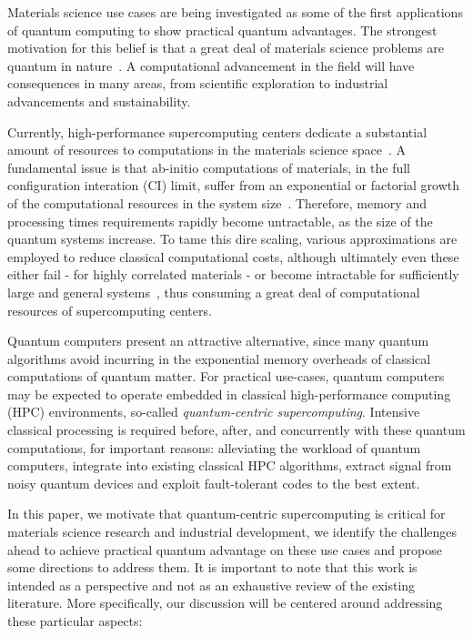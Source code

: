\newcommand{\cmt}[1]{\textcolor{red}{#1}}

\newpage

Materials science use cases are being investigated as some of the first applications of quantum computing to show practical quantum advantages. The strongest motivation for this belief is that a great deal of materials science problems are quantum in nature~\cite{feynman1982simulating}. 
A computational advancement in the field will have consequences in many areas, from scientific exploration to industrial advancements and sustainability.

Currently, high-performance supercomputing centers dedicate a substantial amount of resources to computations in the materials science space~\cite{ALCF_MaterialsScience,austin2020nersc,Connor2023instcomp,DIPC_HPC}. A fundamental issue is that ab-initio computations of materials, in the full configuration interation (CI) limit, suffer from an exponential or factorial growth of the computational resources in the system size~\cite{ciapprox-book,ciapprox-1,doi:10.1021/acs.jctc.7b00725,ciapprox-2,ciapprox-3,ciapprox-4}. Therefore, memory and processing times requirements rapidly become untractable, as the size of the quantum systems increase.
To tame this dire scaling, various approximations are employed to reduce classical computational costs, although ultimately even these either fail - for highly correlated materials - or become intractable for sufficiently large and general systems~\cite{solomonik2014massively,Kim_2018,supermatchem-1,supermatchem-2,supermatchem-3,supermatchem-4,supermatchem-5,supermatchem-6,supermatchem-7,supermatchem-8,supermatchem-9,10.1063/1.3659143}, thus consuming a great deal of computational resources of supercomputing centers.


Quantum computers present an attractive alternative, since many quantum algorithms avoid incurring in the exponential memory overheads of classical computations of quantum matter.
 For practical use-cases, quantum computers may be expected to operate embedded in classical high-performance computing (HPC) environments, so-called \emph{quantum-centric supercomputing}. Intensive classical processing is required before, after, and concurrently with these quantum computations, for important reasons: alleviating the workload of quantum computers, integrate into existing classical HPC algorithms, extract signal from noisy quantum devices and exploit fault-tolerant codes to the best extent.

 In this paper, we motivate that quantum-centric supercomputing is critical for materials science research and industrial development, we identify the challenges ahead to achieve practical quantum advantage on these use cases and propose some directions to address them. It is important to note that this work is intended as a perspective and not as an exhaustive review of the existing literature. More specifically, our discussion will be centered around addressing these particular aspects:

